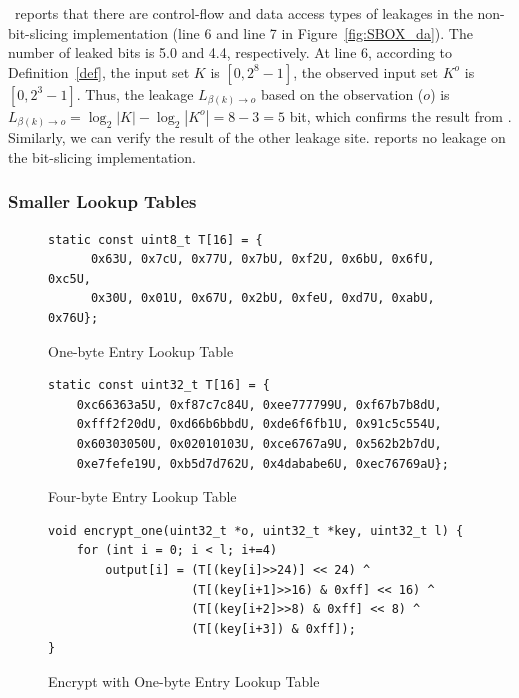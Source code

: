 \tool\ reports that there are control-flow and data access types of leakages
in the non-bit-slicing implementation (line 6 and line 7 in Figure~\ref{fig:SBOX_da}). The number of leaked bits is
5.0 and 4.4, respectively. At line 6, according to Definition~\ref{def}, the
input set $K$ is $[0,2^8-1]$, the observed input set $K^o$ is $[0,2^3-1]$. Thus,
the leakage $L_{\beta(k)\rightarrow o}$ based on the observation ($o$) is
$L_{\beta(k)\rightarrow o} = \log_2{|K|} - \log_2{|K^o|} = 8-3 = 5$ bit, which
confirms the result from \tool. Similarly, we can verify the result of the other
leakage site. \tool{} reports no leakage on the bit-slicing implementation.

\subsubsection{Smaller Lookup Tables}
\begin{figure}[h!]
    \centering
    \begin{lstlisting}[xleftmargin=.02\textwidth,xrightmargin=.01\textwidth]
static const uint8_t T[16] = {
      0x63U, 0x7cU, 0x77U, 0x7bU, 0xf2U, 0x6bU, 0x6fU, 0xc5U,
      0x30U, 0x01U, 0x67U, 0x2bU, 0xfeU, 0xd7U, 0xabU, 0x76U};
      \end{lstlisting}
    \caption{One-byte Entry Lookup Table}
    \label{fig:one_byte_table}
\end{figure}

\begin{figure}[h!]
    \centering
    \begin{lstlisting}[xleftmargin=.02\textwidth,xrightmargin=.01\textwidth]
static const uint32_t T[16] = {
    0xc66363a5U, 0xf87c7c84U, 0xee777799U, 0xf67b7b8dU,
    0xfff2f20dU, 0xd66b6bbdU, 0xde6f6fb1U, 0x91c5c554U,
    0x60303050U, 0x02010103U, 0xce6767a9U, 0x562b2b7dU,
    0xe7fefe19U, 0xb5d7d762U, 0x4dababe6U, 0xec76769aU};
    \end{lstlisting}

    \caption{Four-byte Entry Lookup Table}
    \label{fig:four_byte_table}
\end{figure}
\begin{figure}[h!]
    \centering
    \begin{lstlisting}[xleftmargin=.02\textwidth,xrightmargin=.01\textwidth]
void encrypt_one(uint32_t *o, uint32_t *key, uint32_t l) {
    for (int i = 0; i < l; i+=4)
        output[i] = (T[(key[i]>>24)] << 24) ^
                    (T[(key[i+1]>>16) & 0xff] << 16) ^
                    (T[(key[i+2]>>8) & 0xff] << 8) ^
                    (T[(key[i+3]) & 0xff]);
}
    \end{lstlisting}
    \caption{Encrypt with One-byte Entry Lookup Table}
    \label{fig:one_byte_table_lookup}
\end{figure}

